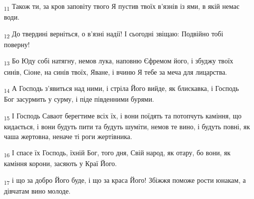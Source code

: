 \begin{tcolorbox}
\textsubscript{11} Також ти, за кров заповіту твого Я пустив твоїх в'язнів із ями, в якій немає води.
\end{tcolorbox}
\begin{tcolorbox}
\textsubscript{12} До твердині верніться, о в'язні надії! І сьогодні звіщаю: Подвійно тобі поверну!
\end{tcolorbox}
\begin{tcolorbox}
\textsubscript{13} Бо Юду собі натягну, немов лука, наповню Єфремом його, і збуджу твоїх синів, Сіоне, на синів твоїх, Яване, і вчиню Я тебе за меча для лицарства.
\end{tcolorbox}
\begin{tcolorbox}
\textsubscript{14} А Господь з'явиться над ними, і стріла Його вийде, як блискавка, і Господь Бог засурмить у сурму, і піде південними бурями.
\end{tcolorbox}
\begin{tcolorbox}
\textsubscript{15} І Господь Саваот берегтиме всіх їх, і вони поїдять та потопчуть каміння, що кидається, і вони будуть пити та будуть шуміти, немов те вино, і будуть повні, як чаша жертовна, неначе ті роги жертівника.
\end{tcolorbox}
\begin{tcolorbox}
\textsubscript{16} І спасе їх Господь, їхній Бог, того дня, Свій народ, як отару, бо вони, як каміння корони, засяють у Краї Його.
\end{tcolorbox}
\begin{tcolorbox}
\textsubscript{17} і що за добро Його буде, і що за краса Його! Збіжжя поможе рости юнакам, а дівчатам вино молоде.
\end{tcolorbox}
